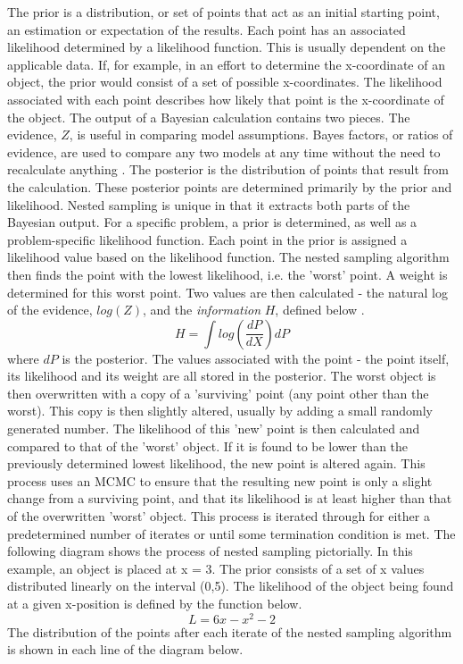 \documentclass[a4paper,12pt]{article}
\begin{document}
The prior is a distribution, or set of points that act as an initial starting point, an estimation or expectation of the results.  Each point has an associated likelihood determined by a likelihood function.  This is usually dependent on the applicable data.  If, for example, in an effort to determine the x-coordinate of an object, the prior would consist of a set of possible x-coordinates.  The likelihood associated with each point describes how likely that point is the x-coordinate of the object.
\newline
The output of a Bayesian calculation contains two pieces. The evidence, $Z$, is useful in comparing model assumptions.  Bayes factors, or ratios of evidence, are used to compare any two models at any time without the need to recalculate anything \cite{skilling}. The posterior is the distribution of points that result from the calculation.  These posterior points are determined primarily by the prior and likelihood.
\newline
Nested sampling is unique in that it extracts both parts of the Bayesian output.  For a specific problem, a prior is determined, as well as a problem-specific likelihood function.  Each point in the prior is assigned a likelihood value based on the likelihood function.  The nested sampling algorithm then finds the point with the lowest likelihood, i.e. the 'worst' point. A weight is determined for this worst point. Two values are then calculated - the natural log of the evidence, $log(Z)$, and the \textit{information} $H$, defined below \cite{sivia}.
\begin{equation}
 H = \int log(\frac{dP}{dX})dP
\end{equation}
where $dP$ is the posterior.  The values associated with the point - the point itself, its likelihood and its weight are all stored in the posterior.  The worst object is then overwritten with a copy of a 'surviving' point (any point other than the worst).  This copy is then slightly altered, usually by adding a small randomly generated number.  The likelihood of this 'new' point is then calculated and compared to that of the 'worst' object.  If it is found to be lower than the previously determined lowest likelihood, the new point is altered again.  This process uses an MCMC to ensure that the resulting new point is only a slight change from a surviving point, and that its likelihood is at least higher than that of the overwritten 'worst' object.
\newline
This process is iterated through for either a predetermined number of iterates or until some termination condition is met.\cite{skilling,sivia}
\newline
The following diagram shows the process of nested sampling pictorially.  In this example, an object is placed at x = 3.  The prior consists of a set of x values distributed linearly on the interval (0,5).  The likelihood of the object being found at a given x-position is defined by the function below.
\begin{equation}
 L = 6x - x^{2} - 2
\end{equation}
The distribution of the points after each iterate of the nested sampling algorithm is shown in each line of the diagram below.
\end{document}

